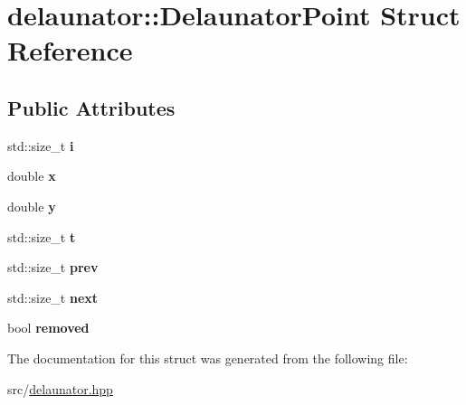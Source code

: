 \hypertarget{structdelaunator_1_1DelaunatorPoint}{}\section{delaunator\+:\+:Delaunator\+Point Struct Reference}
\label{structdelaunator_1_1DelaunatorPoint}
\subsection*{Public Attributes}
\begin{DoxyCompactItemize}
\item 
\mbox{\label{structdelaunator_1_1DelaunatorPoint_aa86be67d87cfc564557b05786ee0213b}} 
std\+::size\+\_\+t {\bfseries i}
\item 
\mbox{\label{structdelaunator_1_1DelaunatorPoint_a6d0cf1b98a5ec895fcac5c1c2a10b926}} 
double {\bfseries x}
\item 
\mbox{\label{structdelaunator_1_1DelaunatorPoint_a9137c3a0356dfc8a330b34f2944864a5}} 
double {\bfseries y}
\item 
\mbox{\label{structdelaunator_1_1DelaunatorPoint_ab35213b07c403aa7ff3d927c7ca0d464}} 
std\+::size\+\_\+t {\bfseries t}
\item 
\mbox{\label{structdelaunator_1_1DelaunatorPoint_ab72027bce56e71be2d68440fbf261722}} 
std\+::size\+\_\+t {\bfseries prev}
\item 
\mbox{\label{structdelaunator_1_1DelaunatorPoint_aa6196f04bd176a2648d63f9235212f6b}} 
std\+::size\+\_\+t {\bfseries next}
\item 
\mbox{\label{structdelaunator_1_1DelaunatorPoint_ad2b84b88913a220615d6179ea6283b0d}} 
bool {\bfseries removed}
\end{DoxyCompactItemize}


The documentation for this struct was generated from the following file\+:\begin{DoxyCompactItemize}
\item 
src/\hyperlink{delaunator_8hpp}{delaunator.\+hpp}\end{DoxyCompactItemize}
